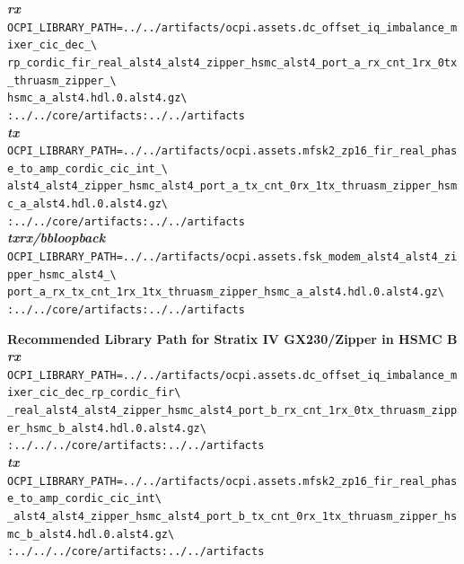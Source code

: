 \begin{appendices}
\noindent
\noindent\textbf{\textit{rx}}\\
\noindent
\verb|OCPI_LIBRARY_PATH=../../artifacts/ocpi.assets.dc_offset_iq_imbalance_mixer_cic_dec_\| \\
\verb|rp_cordic_fir_real_alst4_alst4_zipper_hsmc_alst4_port_a_rx_cnt_1rx_0tx_thruasm_zipper_\| \\
\verb|hsmc_a_alst4.hdl.0.alst4.gz\| \\
\verb|:../../core/artifacts:../../artifacts| \\

\noindent\textbf{\textit{tx}}\\
\verb|OCPI_LIBRARY_PATH=../../artifacts/ocpi.assets.mfsk2_zp16_fir_real_phase_to_amp_cordic_cic_int_\| \\
\verb|alst4_alst4_zipper_hsmc_alst4_port_a_tx_cnt_0rx_1tx_thruasm_zipper_hsmc_a_alst4.hdl.0.alst4.gz\| \\
\verb|:../../core/artifacts:../../artifacts| \\

\noindent\textbf{\textit{txrx/bbloopback}}\\
\verb|OCPI_LIBRARY_PATH=../../artifacts/ocpi.assets.fsk_modem_alst4_alst4_zipper_hsmc_alst4_\| \\
\verb|port_a_rx_tx_cnt_1rx_1tx_thruasm_zipper_hsmc_a_alst4.hdl.0.alst4.gz\| \\
\verb|:../../core/artifacts:../../artifacts| \\
\par\medskip

\noindent\textbf{Recommended Library Path for Stratix IV GX230/Zipper in HSMC B}\\

\noindent\textbf{\textit{rx}}\\
\verb|OCPI_LIBRARY_PATH=../../artifacts/ocpi.assets.dc_offset_iq_imbalance_mixer_cic_dec_rp_cordic_fir\| \\
\verb|_real_alst4_alst4_zipper_hsmc_alst4_port_b_rx_cnt_1rx_0tx_thruasm_zipper_hsmc_b_alst4.hdl.0.alst4.gz\| \\
\verb|:../../../core/artifacts:../../artifacts| \\

\noindent\textbf{\textit{tx}}\\
\verb|OCPI_LIBRARY_PATH=../../artifacts/ocpi.assets.mfsk2_zp16_fir_real_phase_to_amp_cordic_cic_int\| \\
\verb|_alst4_alst4_zipper_hsmc_alst4_port_b_tx_cnt_0rx_1tx_thruasm_zipper_hsmc_b_alst4.hdl.0.alst4.gz\| \\
\verb|:../../../core/artifacts:../../artifacts| \\


\end{appendices}

